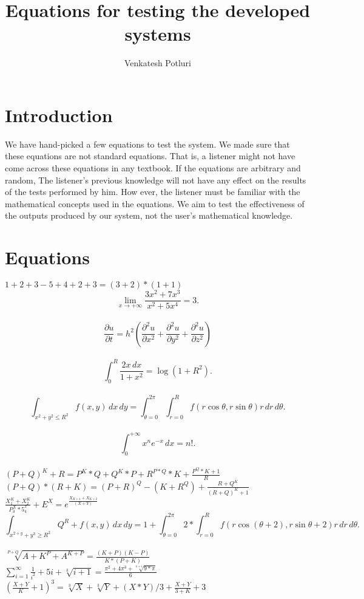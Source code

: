 \documentclass{article}
\begin{document}
\title{Equations for testing the developed systems}
\author{Venkatesh Potluri}
\date{}
\maketitle
\section{Introduction}
We have hand-picked a few equations to test the system. We made sure that these equations are not standard equations. That is, a listener might not have come across these equations in any textbook. If the equations are arbitrary and random, The listener's previous knowledge will not have any effect on the results of the tests performed by him. How ever, the listener must be familiar with the mathematical concepts used in the equations. We aim to test the effectiveness of the outputs produced by our system, not the user's mathematical knowledge.
\section{Equations}
$1+2+3-5+4+2+3 = (3+2)*(1+1)$\\
\[ \lim_{x \to +\infty} \frac{3x^2 +7x^3}{x^2 +5x^4} = 3.\]\\
\[ \frac{\partial u}{\partial t}
   = h^2 \left( \frac{\partial^2 u}{\partial x^2}
      + \frac{\partial^2 u}{\partial y^2}
      + \frac{\partial^2 u}{\partial z^2} \right) \]\\
\[ \int_0^R \frac{2x\,dx}{1+x^2} = \log(1+R^2).\]\\
\[ \int_{x^2 + y^2 \leq R^2} f(x,y)\,dx\,dy
   = \int_{\theta=0}^{2\pi} \int_{r=0}^R
      f(r\cos\theta,r\sin\theta) r\,dr\,d\theta.\]\\
\[ \int_0^{+\infty} x^n e^{-x} \,dx = n!.\]\\
$(P+Q)^K+R = P^K*Q+Q^K*P+R^{P*Q}*K+\frac{P^Q*K+1}{R}$\\
$(P+Q)*(R+K) = (P+R)^Q-(K+R^Q)+\frac{R+Q^K}{(R+Q)^K+1}$\\
$\frac{X_1^K+X_2^K}{P^X_3*5^x_4}+E^X = e^{\frac{X_{K+1}+X_{K+2}}{(X+Y)}}$\\
\[ \int_{x^{2+y} + y^3 \geq R^2} Q^R+f(x,y)\,dx\,dy
   = 1+ \int_{\theta=0}^{2\pi} 2 * \int_{r=0}^R
      f(r\cos(\theta+2),r\sin\theta+2) r\,dr\,d\theta.\]\\
$\sqrt[P+Q]{A+K^P + A^{K+P}}=\frac{(K+P)(K-P)}{K*(P+K)}$\\
$\sum_{i=1}^{\infty} \frac{1}{i^2}+5i+\sqrt[3]{i+1} = \frac{\pi^2+4\pi^3+\sqrt[\pi+i]{9*\pi}}{6}$\\
$(\frac{X+Y}{K}+1)^3=\sqrt[3]{X}+\sqrt[3]{Y}+(X*Y)/3+\frac{X+Y}{3+K}+3$\\
\end{document}
